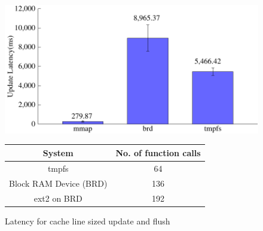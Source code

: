 \begin{figure}[t!]
\begin{minipage}[b]{0.45\linewidth}
\centerline{\includegraphics[width=\columnwidth]{figs/flush-fs}}
\caption{Latency for cache line sized update and flush}
\label{fig:random-update}
\end{minipage}
\hspace{0.04\linewidth}
\begin{minipage}[b]{0.45\linewidth}
\begin{center}
\begin{tabular}{cc}
\toprule
System & No. of function calls \\
\midrule
tmpfs & 64 \\
Block RAM Device (BRD) & 136 \\
ext2 on BRD  & 192 \\
\bottomrule
\end{tabular}
\label{tab:syscall}
\end{center}
\end{minipage}
\end{figure}

